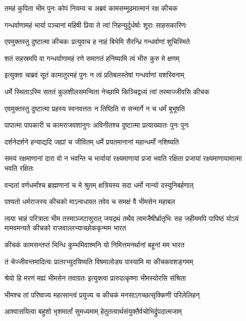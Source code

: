 \twolineshloka
{तमहं कुपिता भीम पुनः कोपं नियम्य च}
{अब्रवं कामसम्मूढमात्मानं रक्ष कीचक}


\twolineshloka
{गन्धर्वाणामहं भार्या पञ्चानां महिषी प्रिया}
{ते त्वां निहन्युर्दुर्धर्षाः शूराः साहसकारिणः}


\twolineshloka
{एवमुक्तस्तु दुष्टात्मा कीचकः प्रत्युवाच ह}
{नाहं बिभेमि सैरन्ध्रि गन्धर्वाणां शुचिस्मिते}


\twolineshloka
{शतं सहस्रमपि वा गन्धर्वाणामहं रणे}
{समागतं हनिष्यामि त्वं भीरु कुरु मे क्षणम्}


\twolineshloka
{इत्युक्ता चाब्रवं सूतं कामातुरमहं पुनः}
{न त्वं प्रतिबलस्तेषां गन्धर्वाणां यशस्विनाम्}


\twolineshloka
{धर्मे स्थिताऽस्मि सततं कुलशीलसमन्विता}
{नेच्छामि किञ्चिद्वध्यं त्वां तस्माज्जीवसि कीचक}


\twolineshloka
{एवमुक्तस्तु दुष्टात्मा प्रहस्य स्वनवत्ततः}
{न तिष्ठिति स सन्मार्गे न च धर्मं बुभूषति}


\twolineshloka
{पापात्मा पापकारी च कामराजवशानुगः}
{अविनीतश्च दुष्टात्मा प्रत्याख्यातः पुनः पुनः}


\twolineshloka
{दर्शनेदर्शने हन्याद्यदि जह्यां च जीवितम्}
{धर्मे प्रयतमानानां महान्धर्मो नशिष्यति}


\threelineshloka
{समयं रक्षमाणानां दारा वो न भवन्ति च}
{भार्यायां रक्ष्यमाणायां प्रजा भवति रक्षिता}
{प्रजायां रक्ष्यमाणायामात्मा भवति रक्षितः}


\twolineshloka
{वन्दतां वर्णधर्मांश्च ब्राह्मणानां च मे श्रुतम्}
{क्षत्रियस्य सदा धर्मो नान्यो दस्युनिबर्हणात्}


\twolineshloka
{पश्यतो धर्मराजस्य कीचको माऽन्वधावत}
{तवेव च समक्षं वै भीमसेन महाबल}


\onelineshloka
{त्वया चाहं परित्राता भीम तस्माञ्जटासुरात्}
\threelineshloka
{जयद्रथं तथैव त्वमजैषीर्भ्रातृभिः सह}
{जहीममपि पापिष्ठं योऽयं मामवमन्यते}
{कीचको राजवाल्लभ्याच्छोककृन्मम भारत}


\twolineshloka
{कीचकं कामसन्तप्तं भिन्धि कुम्भमिवाश्मनि}
{यो निमित्तमनर्थानां बहूनां मम भारत}


\twolineshloka
{तं चेज्जीवन्तमादित्यः प्रातरभ्युदयिष्यति}
{विषमालोड्य पास्यामि मा कीचकवशङ्गमम्}


\twolineshloka
{श्रेयो हि मरणं मह्यं भीमसेन तवाग्रतः}
{इत्युक्त्वा प्रारुदत्कृष्णा भीमस्योरसि संश्रिता}


\twolineshloka
{भीमश्च तां परिष्वज्य महत्सान्त्वं प्रयुज्य च}
{कीचकं मनसाऽगच्छत्सृक्किणी परिलेलिहन्}


\twolineshloka
{आश्वासयित्वा बहुशो भृशमार्तां सुमध्यमाम्}
{हेतुतत्वार्थसंयुक्तैर्वचोभिर्द्रुपदात्मजाम्}


